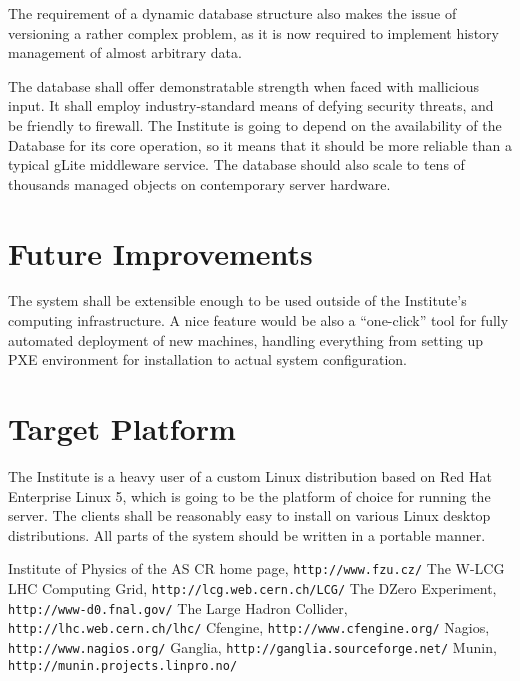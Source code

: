 \documentclass{article}
\begin{document}
The requirement of a dynamic database structure also makes the issue of versioning a rather complex problem, as it is now required
to implement history management of almost arbitrary data. 

The database shall offer demonstratable strength when faced with mallicious input.  It shall employ industry-standard means of
defying security threats, and be friendly to firewall.  The Institute is going to depend on the availability of the Database for
its core operation, so it means that it should be more reliable than a typical gLite middleware service.  The database should also
scale to tens of thousands managed objects on contemporary server hardware.

\section{Future Improvements}

The system shall be extensible enough to be used outside of the Institute's computing infrastructure.  A nice feature would be
also a ``one-click'' tool for fully automated deployment of new machines, handling everything from setting up PXE environment for
installation to actual system configuration.

\section{Target Platform}

The Institute is a heavy user of a custom Linux distribution based on Red Hat Enterprise Linux 5, which is going to be the
platform of choice for running the server.  The clients shall be reasonably easy to install on various Linux desktop
distributions.  All parts of the system should be written in a portable manner.

\begin{thebibliography}{9}
    Institute of Physics of the AS CR home page, {\tt http://www.fzu.cz/}
    The W-LCG LHC Computing Grid, {\tt http://lcg.web.cern.ch/LCG/}
    The DZero Experiment, {\tt http://www-d0.fnal.gov/}
    The Large Hadron Collider, {\tt http://lhc.web.cern.ch/lhc/}
    Cfengine, {\tt http://www.cfengine.org/}
    Nagios, {\tt http://www.nagios.org/}
    Ganglia, {\tt http://ganglia.sourceforge.net/}
    Munin, {\tt http://munin.projects.linpro.no/}
\end{thebibliography}
\end{document}
